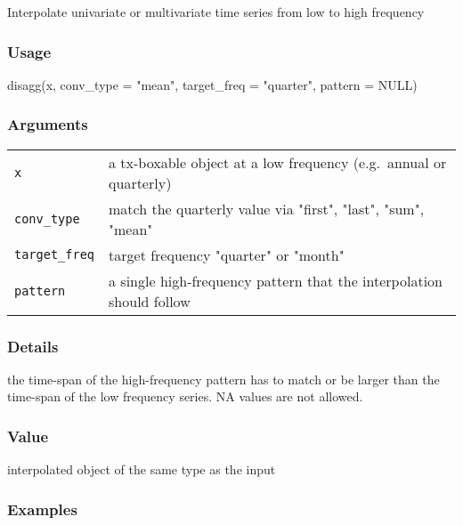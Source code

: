 \documentclass[
  letterpaper,
  DIV=11,
  numbers=noendperiod]{scrreport}
\newenvironment{Shaded}{\begin{snugshade}}{\end{snugshade}}
\newcommand{\AttributeTok}[1]{\textcolor[rgb]{0.40,0.45,0.13}{#1}}
\newcommand{\ConstantTok}[1]{\textcolor[rgb]{0.56,0.35,0.01}{#1}}
\newcommand{\FunctionTok}[1]{\textcolor[rgb]{0.28,0.35,0.67}{#1}}
\newcommand{\NormalTok}[1]{\textcolor[rgb]{0.00,0.23,0.31}{#1}}
\newcommand{\StringTok}[1]{\textcolor[rgb]{0.13,0.47,0.30}{#1}}
\begin{document}
Interpolate univariate or multivariate time series from low to high
frequency

\subsubsection{Usage}\label{usage-26}

\begin{Shaded}
\begin{Highlighting}[]
\FunctionTok{disagg}\NormalTok{(x, }\AttributeTok{conv\_type =} \StringTok{"mean"}\NormalTok{, }\AttributeTok{target\_freq =} \StringTok{"quarter"}\NormalTok{, }\AttributeTok{pattern =} \ConstantTok{NULL}\NormalTok{)}
\end{Highlighting}
\end{Shaded}

\subsubsection{Arguments}\label{arguments-26}

\begin{longtable}[]{@{}ll@{}}
\toprule\noalign{}
\endhead
\bottomrule\noalign{}
\endlastfoot
\texttt{x} & a tx-boxable object at a low frequency (e.g.~annual or
quarterly) \\
\texttt{conv\_type} & match the quarterly value via "first", "last",
"sum", "mean" \\
\texttt{target\_freq} & target frequency "quarter" or "month" \\
\texttt{pattern} & a single high-frequency pattern that the
interpolation should follow \\
\end{longtable}

\subsubsection{Details}\label{details-10}

the time-span of the high-frequency pattern has to match or be larger
than the time-span of the low frequency series. NA values are not
allowed.

\subsubsection{Value}\label{value-26}

interpolated object of the same type as the input

\subsubsection{Examples}\label{examples-26}
\end{document}
